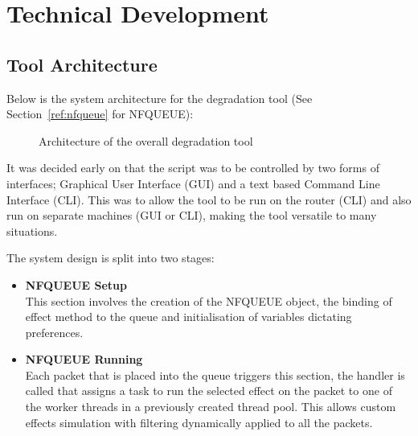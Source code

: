 

\chapter{Technical Development}

%
\section{Tool Architecture}
Below is the system architecture for the degradation tool (See Section~\ref{ref:nfqueue} for NFQUEUE):

\begin{center}
	
	\begin{figure}[h]
		\caption{Architecture of the overall degradation tool}
	\end{figure}
\end{center}

It was decided early on that the script was to be controlled by two forms of interfaces; Graphical User Interface (GUI) and a text based Command Line Interface (CLI). This was to allow the tool to be run on the router (CLI) and also run on separate machines (GUI or CLI), making the tool versatile to many situations.

The system design is split into two stages:

\begin{itemize}
\item {\bf NFQUEUE Setup}\\
This section involves the creation of the NFQUEUE object, the binding of effect method to the queue and initialisation of variables dictating preferences.

\item {\bf NFQUEUE Running}\\
Each packet that is placed into the queue triggers this section, the handler is called that assigns a task to run the selected effect on the packet to one of the worker threads in a previously created thread pool. This allows custom effects simulation with filtering dynamically applied to all the packets.
\end{itemize}

